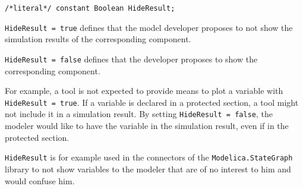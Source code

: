 \begin{annotationdefinition}[HideResult]
\begin{synopsis}\begin{lstlisting}
/*literal*/ constant Boolean HideResult;
\end{lstlisting}\end{synopsis}
\begin{semantics}
\lstinline!HideResult = true! defines that the model developer proposes to not show the simulation results of the corresponding component.

\lstinline!HideResult = false! defines that the developer proposes to show the corresponding component.

\begin{nonnormative}
For example, a tool is not expected to provide means to plot a variable with \lstinline!HideResult = true!.
If a variable is declared in a protected section, a tool might not include it in a simulation result.
By setting \lstinline!HideResult = false!, the modeler would like to have the variable in the simulation result, even if in the protected section.

\lstinline!HideResult! is for example used in the connectors of the \lstinline!Modelica.StateGraph! library to not show variables to the modeler that are of no interest to him and would confuse him.
\end{nonnormative}
\end{semantics}
\end{annotationdefinition}

